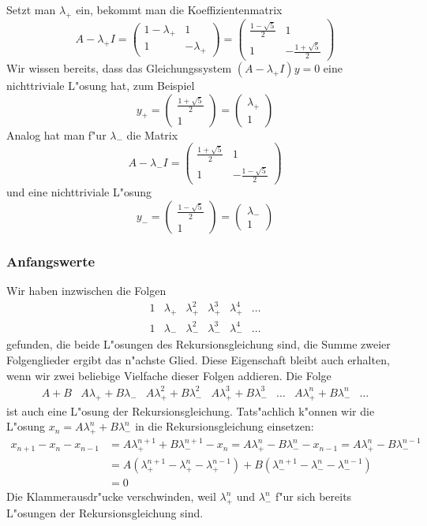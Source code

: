 Setzt man $\lambda_+$ ein, bekommt man die Koeffizientenmatrix
\[
A-\lambda_+I=
\begin{pmatrix}
1-\lambda_+&1\\1&-\lambda_+
\end{pmatrix}
=
\begin{pmatrix}
\frac{1-\sqrt{5}}2&1\\1&-\frac{1+\sqrt{5}}2
\end{pmatrix}
\]
Wir wissen bereits, dass das Gleichungssystem $(A-\lambda_+I)y=0$
eine nichttriviale L"osung hat, zum Beispiel
\[
y_+=\begin{pmatrix}
\frac{1+\sqrt{5}}2\\1
\end{pmatrix}
=\begin{pmatrix}
\lambda_+\\1
\end{pmatrix}
\]
Analog hat man f"ur $\lambda_-$ die Matrix
\[
A-\lambda_-I=
\begin{pmatrix}
\frac{1+\sqrt{5}}2&1\\
1&-\frac{1-\sqrt{5}}2
\end{pmatrix}
\]
und eine nichttriviale L"osung 
\[
y_-=\begin{pmatrix}
\frac{1-\sqrt{5}}2\\
1
\end{pmatrix}=
\begin{pmatrix}
\lambda_-\\1
\end{pmatrix}
\]
\subsubsection{Anfangswerte}
Wir haben inzwischen die Folgen
\[
\begin{matrix}
1&\lambda_+&\lambda_+^2&\lambda_+^3&\lambda_+^4&\dots\\
1&\lambda_-&\lambda_-^2&\lambda_-^3&\lambda_-^4&\dots
\end{matrix}
\]
gefunden, die beide L"osungen des Rekursionsgleichung sind, die Summe
zweier Folgenglieder ergibt das n"achste Glied.
Diese Eigenschaft bleibt auch erhalten, wenn wir zwei beliebige
Vielfache dieser Folgen addieren. Die Folge
\[
\begin{matrix}
A+B
&A\lambda_++B\lambda_-
&A\lambda_+^2+B\lambda_-^2
&A\lambda_+^3+B\lambda_-^3
&\dots
&A\lambda_+^n+B\lambda_-^n
&\dots
\end{matrix}
\]
ist auch eine L"osung der Rekursionsgleichung. Tats"achlich k"onnen
wir die L"osung
$x_n=A\lambda_+^n + B\lambda_-^n$
in die Rekursionsgleichung einsetzen:
\begin{align*}
x_{n+1}-x_n-x_{n-1}
&=A\lambda_+^{n+1} + B\lambda_-^{n+1}
-x_n=A\lambda_+^n - B\lambda_-^n
-x_{n-1}=A\lambda_+^n - B\lambda_-^{n-1}
\\
&=
A(\lambda_+^{n+1}-\lambda_+^n-\lambda_+^{n-1})
+
B(\lambda_-^{n+1}-\lambda_-^n-\lambda_-^{n-1})
\\
&=0
\end{align*}
Die Klammerausdr"ucke verschwinden, weil $\lambda_+^n$ und $\lambda_-^n$
f"ur sich bereits L"osungen der Rekursionsgleichung sind.

